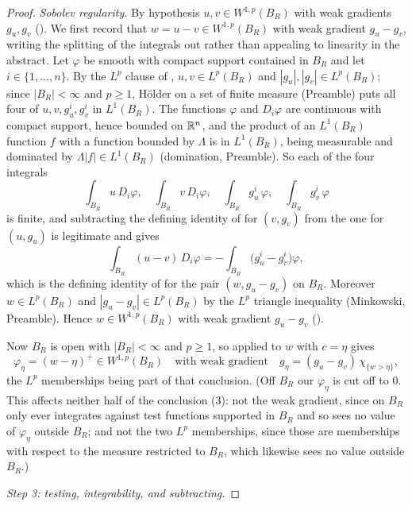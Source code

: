 \begin{proof}
\emph{Sobolev regularity.}  By hypothesis $u,v\in W^{1,p}(B_R)$ with weak
gradients $g_u,g_v$ ().  We first record that
$w=u-v\in W^{1,p}(B_R)$ with weak gradient $g_u-g_v$, writing the splitting of
the integrals out rather than appealing to linearity in the abstract.  Let
$\varphi$ be smooth with compact support contained in $B_R$ and let
$i\in\{1,\dots,n\}$.  By the $L^p$ clause of ,
$u,v\in L^p(B_R)$ and $|g_u|,|g_v|\in L^p(B_R)$; since $|B_R|<\infty$ and
$p\ge1$, H\"older on a set of finite measure (Preamble) puts all four of
$u,v,g_u^i,g_v^i$ in $L^1(B_R)$.  The functions $\varphi$ and $D_i\varphi$ are
continuous with compact support, hence bounded on $\mathbb{R}^n$, and the product of an
$L^1(B_R)$ function $f$ with a function bounded by $\Lambda$ is in $L^1(B_R)$,
being measurable and dominated by $\Lambda|f|\in L^1(B_R)$ (domination,
Preamble).  So
each of the four integrals
\[
\int_{B_R}u\,D_i\varphi,\quad
\int_{B_R}v\,D_i\varphi,\quad
\int_{B_R}g_u^i\,\varphi,\quad
\int_{B_R}g_v^i\,\varphi
\]
is finite, and subtracting the defining identity of
 for $(v,g_v)$ from the one for $(u,g_u)$ is
legitimate and gives
\[
\int_{B_R}(u-v)\,D_i\varphi=-\int_{B_R}\bigl(g_u^i-g_v^i\bigr)\varphi ,
\]
which is the defining identity of  for the pair
$(w,g_u-g_v)$ on $B_R$.  Moreover $w\in L^p(B_R)$ and $|g_u-g_v|\in L^p(B_R)$
by the $L^p$ triangle inequality (Minkowski, Preamble).  Hence
$w\in W^{1,p}(B_R)$ with weak gradient $g_u-g_v$ ().

Now $B_R$ is open with $|B_R|<\infty$ and $p\ge1$, so
 applied to
$w$ with $c=\eta$ gives
\[
\varphi_\eta=(w-\eta)^+\in W^{1,p}(B_R)\quad\text{with weak gradient}\quad
g_\eta=(g_u-g_v)\,\chi_{\{w>\eta\}} ,
\tag{3}
\]
the $L^p$ memberships being part of that conclusion.  (Off $B_R$ our $\varphi_\eta$ is cut off to $0$.  This affects neither half of
the conclusion (3): not the weak gradient, since
 on $B_R$ only ever integrates against test functions
supported in $B_R$ and so sees no value of $\varphi_\eta$ outside $B_R$; and not
the two $L^p$ memberships, since those are memberships with respect to the
measure restricted to $B_R$, which likewise sees no value outside $B_R$.)

\emph{Step 3: testing, integrability, and subtracting.}


\end{proof}
